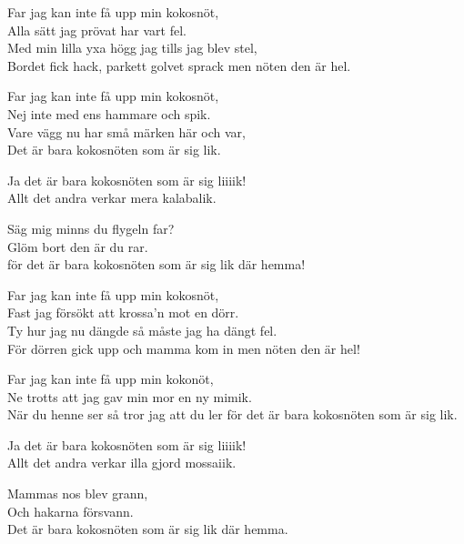 \vspace{10pt}
\par
Far jag kan inte få upp min kokosnöt,\\
Alla sätt jag prövat har vart fel.\\
Med min lilla yxa högg jag tills jag blev stel,\\
Bordet fick hack, parkett golvet sprack men nöten den är hel.\par
\vspace{10pt}
Far jag kan inte få upp min kokosnöt,\\
Nej inte med ens hammare och spik.\\
Vare vägg nu har små märken här och var,\\
Det är bara kokosnöten som är sig lik.\par
\vspace{10pt}
Ja det är bara kokosnöten som är sig liiiik!\\
Allt det andra verkar mera kalabalik.\par
\vspace{10pt}
Säg mig minns du flygeln far?\\
Glöm bort den är du rar.\\
för det är bara kokosnöten som är sig lik där hemma!\par
\vspace{10pt}
Far jag kan inte få upp min kokosnöt,\\
Fast jag försökt att krossa'n mot en dörr.\\
Ty hur jag nu dängde så måste jag ha dängt fel.\\
För dörren gick upp och mamma kom in men nöten den är hel!\par
\vspace{10pt}
Far jag kan inte få upp min kokonöt,\\
Ne trotts att jag gav min mor en ny mimik.\\
När du henne ser så tror jag att du ler för det är bara kokosnöten som är sig lik.\par
\vspace{10pt}
Ja det är bara kokosnöten som är sig liiiik!\\
Allt det andra verkar illa gjord mossaiik.\par
\vspace{10pt}
Mammas nos blev grann,\\
Och hakarna försvann.\\
Det är bara kokosnöten som är sig lik där hemma.\par
